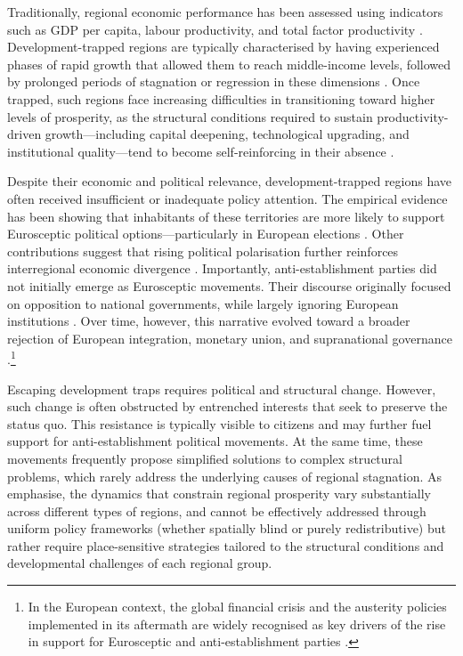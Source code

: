 \documentclass[a4paper,11pt,oneside]{article}
\begin{document}
Traditionally, regional economic performance has been assessed using indicators such as GDP per capita, labour productivity, and total factor productivity \citep{tortosa2005growth}. Development-trapped regions are typically characterised by having experienced phases of rapid growth that allowed them to reach middle-income levels, followed by prolonged periods of stagnation or regression in these dimensions \citep{kharas2011middle,felipe2012tracking}. Once trapped, such regions face increasing difficulties in transitioning toward higher levels of prosperity, as the structural conditions required to sustain productivity-driven growth—including capital deepening, technological upgrading, and institutional quality—tend to become self-reinforcing in their absence \citep{azariadis2005poverty,rodriguez2020institutions}.



Despite their economic and political relevance, development-trapped regions have often received insufficient or inadequate policy attention. The empirical evidence has been showing that inhabitants of these territories are more likely to support Eurosceptic political options---particularly in European elections \citep{dijkstra2020geography}. Other contributions suggest that rising political polarisation further reinforces interregional economic divergence \citep{storper2018separate,mccann2020perceptions}. Importantly, anti-establishment parties did not initially emerge as Eurosceptic movements. Their discourse originally focused on opposition to national governments, while largely ignoring European institutions \citep{kriesi2006globalization,hooghe2007sources}. Over time, however, this narrative evolved toward a broader rejection of European integration, monetary union, and supranational governance \citep{leconte2015pathology,rodrik2017populism}.\footnote{In the European context, the global financial crisis and the austerity policies implemented in its aftermath are widely recognised as key drivers of the rise in support for Eurosceptic and anti-establishment parties \citep{algan2017european}.}



Escaping development traps requires political and structural change. However, such change is often obstructed by entrenched interests that seek to preserve the status quo. This resistance is typically visible to citizens and may further fuel support for anti-establishment political movements. At the same time, these movements frequently propose simplified solutions to complex structural problems, which rarely address the underlying causes of regional stagnation. As \cite{iammarino2019regional} emphasise, the dynamics that constrain regional prosperity vary substantially across different types of regions, and cannot be effectively addressed through uniform policy frameworks (whether spatially blind or purely redistributive) but rather require place-sensitive strategies tailored to the structural conditions and developmental challenges of each regional group.
\end{document}
